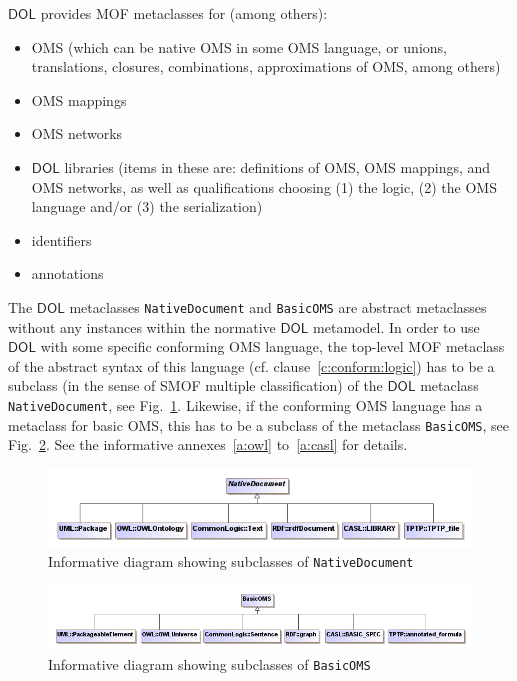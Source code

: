 \documentclass[10pt, a4paper]{isov2}
\makeatletter
\newcommand{\red}[1]{#1} %
\newcommand*{\cf}{cf.\@\xspace}
\newcommand*{\syntax}[1]{\texttt{#1}}
\newcommand*{\DOL}{\ensuremath{\mathsf{DOL}}\xspace}
\renewcommand{\clauserefname}{clause}
\renewcommand{\cref}[1]{\clauserefname~\ref{#1}}
\makeatother
\begin{document}
\DOL provides MOF metaclasses for (among others):   
\begin{itemize}
\item OMS (which can be native OMS in some OMS language, or unions, translations,  closures, combinations, approximations of OMS, among others)
\item OMS mappings 
\item OMS networks
\item \DOL libraries (items in these are: definitions of OMS, OMS mappings, and OMS networks, as well as qualifications choosing (1) the logic,
(2) the OMS language and/or (3) the serialization)
\item identifiers
\item annotations
\end{itemize}
 
The \DOL metaclasses \syntax{NativeDocument} and \syntax{BasicOMS} are
abstract metaclasses without any instances within the normative \DOL
metamodel.  In order to use \DOL with some specific conforming OMS language, the top-level MOF
metaclass of the abstract syntax of this language
(\cf \cref{c:conform:logic}) has to be a subclass (in the sense of
SMOF multiple classification) of the \DOL metaclass
\syntax{NativeDocument}, see Fig.~\ref{fig:native_document}. 
Likewise, if the conforming OMS language has a metaclass for basic OMS,
this has to be a subclass of the metaclass \syntax{BasicOMS},
see Fig.~\ref{fig:basic_oms}.
See the informative annexes~\ref{a:owl} to~\ref{a:casl} for details.


\begin{figure}[b]
  \centering
    \includegraphics[scale=0.47]{mof/native_document.png}
   \caption{Informative diagram showing subclasses of \syntax{NativeDocument}}
   \label{fig:native_document}
\end{figure}


\begin{figure}
  \centering
    \includegraphics[scale=0.47]{mof/basic_oms.png}
   \caption{Informative diagram showing subclasses of \syntax{BasicOMS}}
   \label{fig:basic_oms}
\end{figure}
\end{document}
